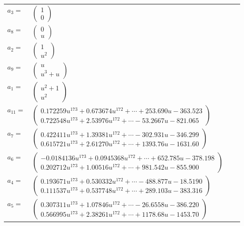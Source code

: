 \documentclass[1p]{elsarticle_modified}
\theoremstyle{definition}
\begin{document}
\begin{tabular}{m{7pt} m{180pt} m{7pt} m{180pt} }
\flushright $a_{3}=$&$\begin{pmatrix}1\\0\end{pmatrix}$ \\
\flushright $a_{8}=$&$\begin{pmatrix}0\\u\end{pmatrix}$ \\
\flushright $a_{2}=$&$\begin{pmatrix}1\\u^2\end{pmatrix}$ \\
\flushright $a_{9}=$&$\begin{pmatrix}u\\u^3+u\end{pmatrix}$ \\
\flushright $a_{1}=$&$\begin{pmatrix}u^2+1\\u^2\end{pmatrix}$ \\
\flushright $a_{11}=$&$\begin{pmatrix}0.172259 u^{173}+0.673674 u^{172}+\cdots+253.690 u-363.523\\0.722548 u^{173}+2.53976 u^{172}+\cdots-53.2667 u-821.065\end{pmatrix}$ \\
\flushright $a_{7}=$&$\begin{pmatrix}0.422411 u^{173}+1.39381 u^{172}+\cdots-302.931 u-346.299\\0.615721 u^{173}+2.61270 u^{172}+\cdots+1393.76 u-1631.60\end{pmatrix}$ \\
\flushright $a_{6}=$&$\begin{pmatrix}-0.0184136 u^{173}+0.0945368 u^{172}+\cdots+652.785 u-378.198\\0.202712 u^{173}+1.00516 u^{172}+\cdots+981.542 u-855.900\end{pmatrix}$ \\
\flushright $a_{4}=$&$\begin{pmatrix}0.193671 u^{173}+0.530332 u^{172}+\cdots-488.877 u-18.5190\\0.111537 u^{173}+0.537748 u^{172}+\cdots+289.103 u-383.316\end{pmatrix}$ \\
\flushright $a_{5}=$&$\begin{pmatrix}0.307311 u^{173}+1.07846 u^{172}+\cdots-26.6558 u-386.220\\0.566995 u^{173}+2.38261 u^{172}+\cdots+1178.68 u-1453.70\end{pmatrix}$ \\

\end{tabular}
\end{document}
